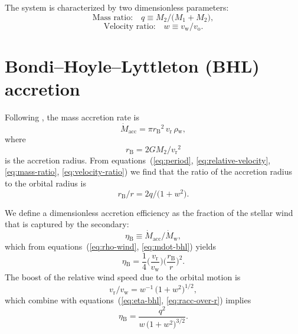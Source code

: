 \documentclass[useAMS, usenatbib, a4paper]{mnras}
\newcommand\wind{\ensuremath{_{\mathrm{w}}}}
\newcommand\mdwind{\ensuremath{\dot M\wind}}
\newcommand\orb{\ensuremath{_{\mathrm{o}}}}
\newcommand\rel{\ensuremath{_{\mathrm{r}}}}
\newcommand\bhl{\ensuremath{_{\mathrm{\scriptscriptstyle B}}}}
\newcommand\acc{\ensuremath{_{\mathrm{acc}}}}
\newcommand\mdacc{\ensuremath{\dot M\acc}}
\begin{document}
The system is characterized by two dimensionless parameters:
\begin{equation}
  \label{eq:mass-ratio}
  \text{Mass ratio:}\quad q \equiv M_2 / \bigl(M_1 + M_2\bigr),
\end{equation}
\begin{equation}
  \label{eq:velocity-ratio}
  \text{Velocity ratio:}\quad w \equiv v\wind / v\orb.
\end{equation}

\section{Bondi--Hoyle--Lyttleton (BHL) accretion}
\label{sec:bondi-hoyle-lyttl}


Following \citet{Hoyle:1939a, Bondi:1944a},
the mass accretion rate is
\begin{equation}
  \label{eq:mdot-bhl}
  \mdacc = \pi r\bhl^2 \, v\rel \, \rho\wind , 
\end{equation}
where
\begin{equation}
  \label{eq:radius-bhl}
  r\bhl = 2 G M_2 / v\rel^2 
\end{equation}
is the accretion radius.
From equations~(\ref{eq:period}, \ref{eq:relative-velocity}, \ref{eq:mass-ratio}, \ref{eq:velocity-ratio}) we find that the ratio of the accretion radius to the orbital radius is
\begin{equation}
  \label{eq:racc-over-r}
  r\bhl / r = 2 q / \bigl(1 + w^2\bigr).
\end{equation}

We define a dimensionless accretion efficiency as the fraction of the stellar wind that is captured by the secondary:
\begin{equation}
  \label{eq:eta-bhl-def}
  \eta\bhl \equiv \mdacc / \mdwind ,
\end{equation}
which from equations~(\ref{eq:rho-wind}, \ref{eq:mdot-bhl}) yields
\begin{equation}
  \label{eq:eta-bhl}
  \eta\bhl = \frac{1}{4}
  \biggl( \frac{v\rel}{v\wind} \biggr)
  \biggl( \frac{r\bhl}{r}\biggr)^2 . 
\end{equation}
The boost of the relative wind speed due to the orbital motion is
\begin{equation}
  \label{eq:boost-ratio}
  v\rel / v\wind =  w^{-1} \, \bigl(1 + w^2\bigr)^{1/2} ,
\end{equation}
which combine with equations~(\ref{eq:eta-bhl}, \ref{eq:racc-over-r}) implies
\begin{equation}
  \label{eq:eta-bhl-dimensionless}
  \eta\bhl = \frac{q^2}{w \, \bigl(1 + w^2\bigr)^{3/2}} .
\end{equation}
\end{document}
